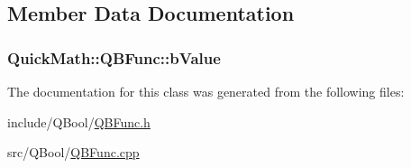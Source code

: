 \subsection{Member Data Documentation}
\hypertarget{classQuickMath_1_1QBFunc_af53f2f11b453fbb4e55310d9a34f5da2}{}
\subsubsection[{b\+Value}]{ Quick\+Math\+::\+Q\+B\+Func\+::b\+Value\hspace{0.3cm}{\ttfamily [private]}}\label{classQuickMath_1_1QBFunc_af53f2f11b453fbb4e55310d9a34f5da2}


The documentation for this class was generated from the following files\+:\begin{DoxyCompactItemize}
\item 
include/\+Q\+Bool/\hyperlink{QBFunc_8h}{Q\+B\+Func.\+h}\item 
src/\+Q\+Bool/\hyperlink{QBFunc_8cpp}{Q\+B\+Func.\+cpp}\end{DoxyCompactItemize}
